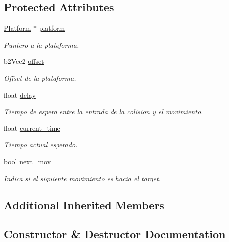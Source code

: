 \subsection*{Protected Attributes}
\begin{DoxyCompactItemize}
\item 
\mbox{\hyperlink{classexample_1_1_platform}{Platform}} $\ast$ \mbox{\hyperlink{classexample_1_1_sensor_afb349009afdce990f4ce4728634e7b58}{platform}}
\begin{DoxyCompactList}\small\item\em Puntero a la plataforma. \end{DoxyCompactList}\item 
b2\+Vec2 \mbox{\hyperlink{classexample_1_1_sensor_a7cabbf4676f11e6cf6059ef84b4dc1e9}{offset}}
\begin{DoxyCompactList}\small\item\em Offset de la plataforma. \end{DoxyCompactList}\item 
float \mbox{\hyperlink{classexample_1_1_sensor_ac2e45c749b3c91d09da0aacd8b24db89}{delay}}
\begin{DoxyCompactList}\small\item\em Tiempo de espera entre la entrada de la colision y el movimiento. \end{DoxyCompactList}\item 
float \mbox{\hyperlink{classexample_1_1_sensor_aadf52308777810c4f22a96992ae6467c}{current\+\_\+time}}
\begin{DoxyCompactList}\small\item\em Tiempo actual esperado. \end{DoxyCompactList}\item 
bool \mbox{\hyperlink{classexample_1_1_sensor_aa31ff020f203760129a64b931d844aed}{next\+\_\+mov}}
\begin{DoxyCompactList}\small\item\em Indica si el siguiente movimiento es hacia el target. \end{DoxyCompactList}\end{DoxyCompactItemize}
\subsection*{Additional Inherited Members}


\subsection{Constructor \& Destructor Documentation}
\mbox{\label{classexample_1_1_sensor_af43334a558e2faf4563b5624e6c33319}} 
